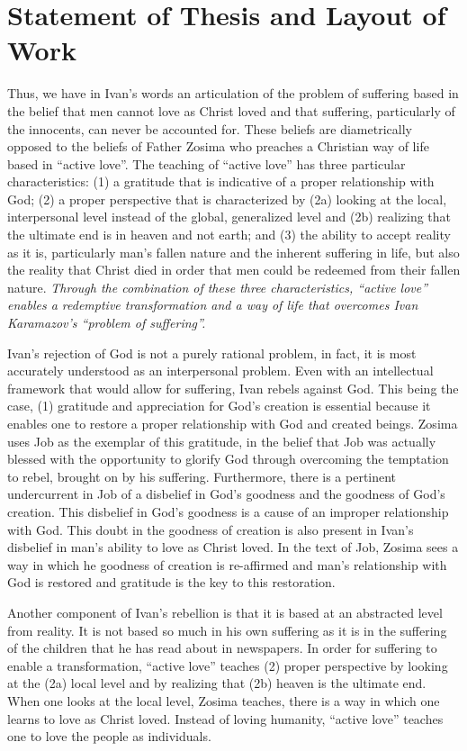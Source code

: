 \section{Statement of Thesis and Layout of Work}

Thus, we have in Ivan's words an articulation of the problem of suffering based in the belief that men cannot love as Christ loved and that suffering, particularly of the innocents, can never be accounted for. These beliefs are diametrically opposed to the beliefs of Father Zosima who preaches a Christian way of life based in ``active love''. The teaching of ``active love'' has three particular characteristics: (1) a gratitude that is indicative of a proper relationship with God; (2) a proper perspective that is characterized by (2a) looking at the local, interpersonal level instead of the global, generalized level and (2b) realizing that the ultimate end is in heaven and not earth; and (3) the ability to accept reality as it is, particularly man's fallen nature and the inherent suffering in life, but also the reality that Christ died in order that men could be redeemed from their fallen nature. \emph{Through the combination of these three characteristics, ``active love'' enables a redemptive transformation and a way of life that overcomes Ivan Karamazov's ``problem of suffering''.}

Ivan's rejection of God is not a purely rational problem, in fact, it is most accurately understood as an interpersonal problem. Even with an intellectual framework that would allow for suffering, Ivan rebels against God. This being the case, (1) gratitude and appreciation for God's creation is essential because it enables one to restore a proper relationship with God and created beings. Zosima uses Job as the exemplar of this gratitude, in the belief that Job was actually blessed with the opportunity to glorify God through overcoming the temptation to rebel, brought on by his suffering. Furthermore, there is a pertinent undercurrent in Job of a disbelief in God's goodness and the goodness of God's creation. This disbelief in God's goodness is a cause of an improper relationship with God. This doubt in the goodness of creation is also present in Ivan's disbelief in man's ability to love as Christ loved. In the text of Job, Zosima sees a way in which he goodness of creation is re-affirmed and man's relationship with God is restored and gratitude is the key to this restoration.

Another component of Ivan's rebellion is that it is based at an abstracted level from reality. It is not based so much in his own suffering as it is in the suffering of the children that he has read about in newspapers. In order for suffering to enable a transformation, ``active love'' teaches (2) proper perspective by looking at the (2a) local level and by realizing that (2b) heaven is the ultimate end. When one looks at the local level, Zosima teaches, there is a way in which one learns to love as Christ loved. Instead of loving humanity, ``active love'' teaches one to love the people as individuals.

